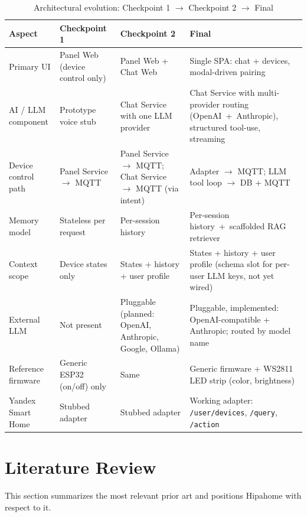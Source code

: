 \documentclass[a4paper,12pt]{article}
\begin{document}
\begin{table}[h]
\centering
\caption{Architectural evolution: Checkpoint 1 $\to$ Checkpoint 2 $\to$ Final}
\label{tab:evolution}
\small
\begin{tabularx}{\textwidth}{lXXX}
\toprule
\textbf{Aspect} & \textbf{Checkpoint 1} & \textbf{Checkpoint 2} & \textbf{Final} \\
\midrule
Primary UI & Panel Web (device control only) & Panel Web + Chat Web & Single SPA: chat + devices, modal-driven pairing \\
AI / LLM component & Prototype voice stub & Chat Service with one LLM provider & Chat Service with multi-provider routing (OpenAI~+~Anthropic), structured tool-use, streaming \\
Device control path & Panel Service $\to$ MQTT & Panel Service $\to$ MQTT; Chat Service $\to$ MQTT (via intent) & Adapter $\to$ MQTT; LLM tool loop $\to$ DB + MQTT \\
Memory model & Stateless per request & Per-session history & Per-session history~+~scaffolded RAG retriever \\
Context scope & Device states only & States + history + user profile & States + history + user profile (schema slot for per-user LLM keys, not yet wired) \\
External LLM & Not present & Pluggable (planned: OpenAI, Anthropic, Google, Ollama) & Pluggable, implemented: OpenAI-compatible + Anthropic; routed by model name \\
Reference firmware & Generic ESP32 (on/off) only & Same & Generic firmware + WS2811 LED strip (color, brightness) \\
Yandex Smart Home & Stubbed adapter & Stubbed adapter & Working adapter: \verb|/user/devices|, \verb|/query|, \verb|/action| \\
\bottomrule
\end{tabularx}
\end{table}

\newpage

\section{Literature Review}
\label{sec:lit}

This section summarizes the most relevant prior art and positions Hipahome with respect to it.
\end{document}
